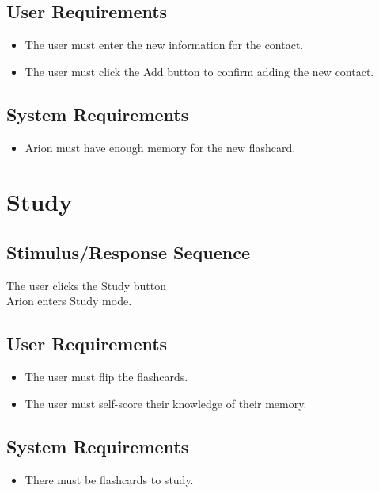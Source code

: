 \documentclass{scrreprt}
\begin{document}
    \subsection*{User Requirements}
        \begin{itemize}
            \item The user must enter the new information for the contact.
            \item The user must click the Add button to confirm adding the new contact.
        \end{itemize}

    \subsection*{System Requirements}
        \begin{itemize}
            \item Arion must have enough memory for the new flashcard.
        \end{itemize}

\section{Study}
    \subsection*{Stimulus/Response Sequence}
        \begin{flushleft}
             The user clicks the Study button  \\
             Arion enters Study mode. \\
        \end{flushleft}

    \subsection*{User Requirements}
        \begin{itemize}
            \item The user must flip the flashcards.
            \item The user must self-score their knowledge of their memory.
        \end{itemize}

    \subsection*{System Requirements}
        \begin{itemize}
            \item There must be flashcards to study.
        \end{itemize}
\end{document}
